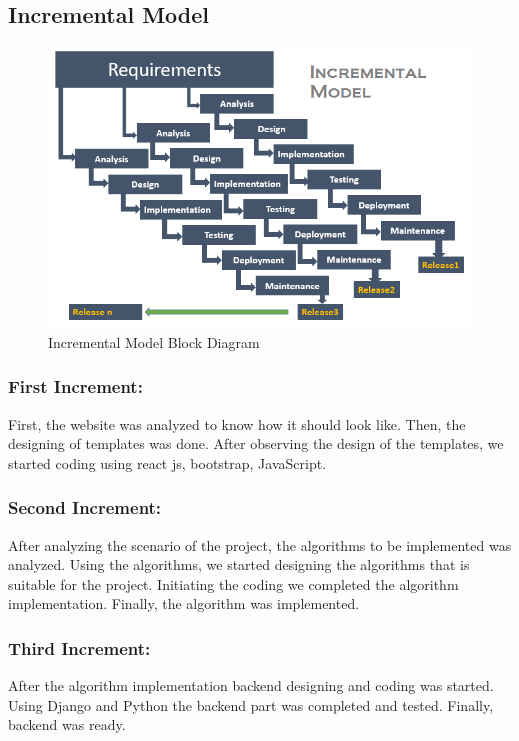\subsection{Incremental Model}
\begin{figure}[H]
	\centering
	\includegraphics[width=160mm]{images/incremental model.png}{}
	\caption{Incremental Model Block Diagram} %
	\label{figincremental} %
\end{figure}

\subsubsection{First Increment:}
First, the website was analyzed to know how it should look like.
Then, the designing of templates was done. After observing the design of the
templates, we started coding using react js, bootstrap, JavaScript.

\subsubsection{Second Increment:}
After analyzing the scenario of the project, the algorithms to be
implemented was analyzed. Using the algorithms, we started designing
the algorithms that is suitable for the project. Initiating the coding we
completed the algorithm implementation.
Finally, the algorithm was implemented.

\subsubsection{Third Increment:}
After the algorithm implementation backend designing and coding
was started. Using Django and Python the backend part
was completed and tested. Finally, backend was ready.

